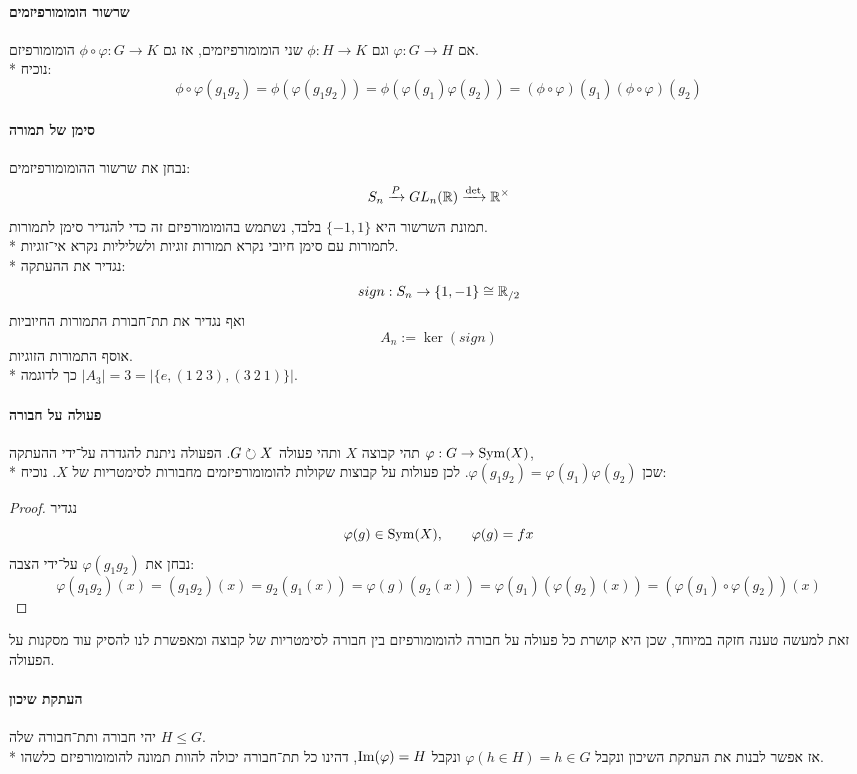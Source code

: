 \paragraph{שרשור הומומורפיזמים}
אם $\varphi : G \to H$ וגם $\phi : H \to K$ שני הומומורפיזמים, אז גם $\phi \circ \varphi : G \to K$ הומומורפיזם. \\*
נוכיח:
\[
	\phi \circ \varphi(g_1 g_2) = \phi(\varphi(g_1 g_2)) = \phi(\varphi(g_1) \varphi(g_2)) = (\phi \circ \varphi)(g_1) (\phi \circ \varphi)(g_2)
\]

\paragraph{סימן של תמורה}
נבחן את שרשור ההומומורפיזמים:
\[
	S_n \xrightarrow{P} GL_n(\mathbb{R}) \xrightarrow{\det} \mathbb{R}^\times
\]
תמונת השרשור היא $\{ -1, 1 \}$ בלבד, נשתמש בהומומורפיזם זה כדי להגדיר סימן לתמורות. \\*
לתמורות עם סימן חיובי נקרא תמורות זוגיות ולשליליות נקרא אי־זוגיות. \\*
נגדיר את ההעתקה:
\[
	sign : S_n \to \{1, -1\} \cong \mathbb{R}_{/2}
\]
ואף נגדיר את תת־חבורת התמורות החיוביות
\[
	A_n := \ker(sign)
\]
אוסף התמורות הזוגיות. \\*
כך לדוגמה $|A_3| = 3 = |\{e, (1\ 2\ 3), (3\ 2\ 1)\}|$.

\paragraph{פעולה על חבורה}
תהי קבוצה $X$ ותהי פעולה $G \circlearrowright X$. הפעולה ניתנת להגדרה על־ידי ההעתקה $\varphi : G \to \operatorname{Sym}(X)$, \\*
שכן $\varphi(g_1 g_2) = \varphi(g_1) \varphi(g_2)$.
לכן פעולות על קבוצות שקולות להומומורפיזמים מחבורות לסימטריות של $X$.
נוכיח:
\begin{proof}
	נגדיר
	\[
		\varphi(g) \in \operatorname{Sym}(X),
		\qquad
		\varphi(g) = fx
	\]
	נבחן את $\varphi(g_1g_2)$ על־ידי הצבה:
	\[
		\varphi(g_1g_2)(x)
		= (g_1 g_2)(x)
		= g_2(g_1(x))
		= \varphi(g)(g_2(x))
		= \varphi(g_1)(\varphi(g_2)(x))
		= (\varphi(g_1) \circ \varphi(g_2))(x)
	\]
\end{proof}
זאת למעשה טענה חזקה במיוחד, שכן היא קושרת כל פעולה על חבורה להומומורפיזם בין חבורה לסימטריות של קבוצה ומאפשרת לנו להסיק עוד מסקנות על הפעולה.

\paragraph{העתקת שיכון}
יהי חבורה ותת־חבורה שלה $H \le G$. \\*
אז אפשר לבנות את העתקת השיכון ונקבל $\varphi(h \in H) = h \in G$ ונקבל $\operatorname{Im}(\varphi) = H$, דהינו כל תת־חבורה יכולה להוות תמונה להומומורפיזם כלשהו.

